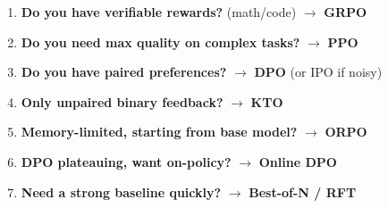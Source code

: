 \begin{keybox}
\begin{enumerate}
  \item \textbf{Do you have verifiable rewards?} (math/code) $\rightarrow$ \textbf{GRPO}
  \item \textbf{Do you need max quality on complex tasks?} $\rightarrow$ \textbf{PPO}
  \item \textbf{Do you have paired preferences?} $\rightarrow$ \textbf{DPO} (or IPO if noisy)
  \item \textbf{Only unpaired binary feedback?} $\rightarrow$ \textbf{KTO}
  \item \textbf{Memory-limited, starting from base model?} $\rightarrow$ \textbf{ORPO}
  \item \textbf{DPO plateauing, want on-policy?} $\rightarrow$ \textbf{Online DPO}
  \item \textbf{Need a strong baseline quickly?} $\rightarrow$ \textbf{Best-of-N / RFT}
\end{enumerate}
\end{keybox}

